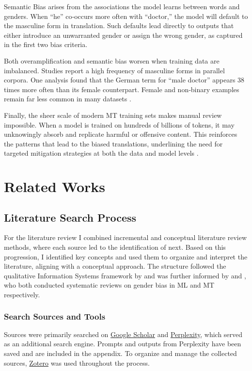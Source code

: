    Semantic Bias arises from the associations the model learns between words and genders. When “he” co‑occurs more often with “doctor,” the model will default to the masculine form in translation. Such defaults lead directly to outputs that either introduce an unwarranted gender or assign the wrong gender, as captured in the first two bias criteria. 
    
    Both overamplification and semantic bias worsen when training data are imbalanced. Studies report a high frequency of masculine forms in parallel corpora. One analysis found that the German term for “male doctor” appears 38 times more often than its female counterpart. Female and non‑binary examples remain far less common in many datasets \parencite{ullmannGenderBiasMachine2022,stanczakSurveyGenderBias2021}.

    Finally, the sheer scale of modern MT training sets makes manual review impossible. When a model is trained on hundreds of billions of tokens, it may unknowingly absorb and replicate harmful or offensive content. This reinforces the patterns that lead to the biased translations, underlining the need for targeted mitigation strategies at both the data and model levels \parencite{ullmannGenderBiasMachine2022}.


\section{Related Works}

    \subsection{Literature Search Process}
        For the literature review I combined incremental and conceptual literature review methods, where each source led to the identification of next. Based on this progression, I identified key concepts and used them to organize and interpret the literature, aligning with a conceptual approach. The structure followed the qualitative Information Systems framework by \textcite{schryenWritingQualitativeLiterature2015} and was further informed by \textcite{shresthaExploringGenderBiases2022} and \textcite{savoldiDecadeGenderBias2025}, who both conducted systematic reviews on gender bias in ML and MT respectively. 

        \subsubsection{Search Sources and Tools}
        Sources were primarily searched on \href{https://scholar.google.com/}{Google Scholar} and \href{https://www.perplexity.ai/}{Perplexity}, which served as an additional search engine. Prompts and outputs from Perplexity have been saved and are included in the appendix. To organize and manage the collected sources, \href{https://www.zotero.org/}{Zotero} was used throughout the process.

